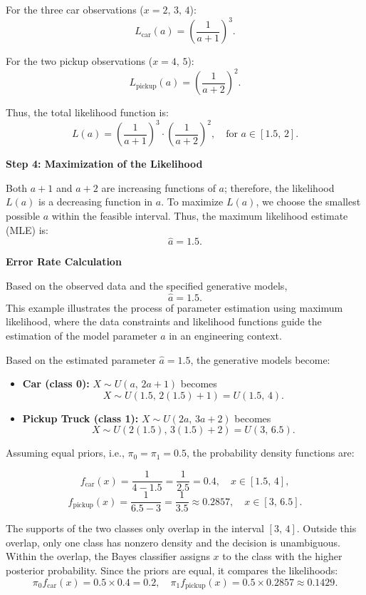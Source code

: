 \documentclass[12pt]{article}
\begin{document}
For the three car observations (\(x = 2,\, 3,\, 4\)):
\[
L_{\text{car}}(a) = \left(\frac{1}{a+1}\right)^3.
\]

For the two pickup observations (\(x = 4,\, 5\)):
\[
L_{\text{pickup}}(a) = \left(\frac{1}{a+2}\right)^2.
\]

Thus, the total likelihood function is:
\[
L(a) = \left(\frac{1}{a+1}\right)^3 \cdot \left(\frac{1}{a+2}\right)^2, \quad \text{for } a \in [1.5,\,2].
\]

\noindent \textbf{Step 4: Maximization of the Likelihood}

Both \(a+1\) and \(a+2\) are increasing functions of \(a\); therefore, the likelihood \(L(a)\) is a decreasing function in \(a\). To maximize \(L(a)\), we choose the smallest possible \(a\) within the feasible interval. Thus, the maximum likelihood estimate (MLE) is:
\[
\hat{a} = 1.5.
\]

\noindent \textbf{Error Rate Calculation}

Based on the observed data and the specified generative models,
\[
\boxed{\hat{a} = 1.5.}
\]
This example illustrates the process of parameter estimation using maximum likelihood, where the data constraints and likelihood functions guide the estimation of the model parameter \(a\) in an engineering context.

Based on the estimated parameter \(\hat{a} = 1.5\), the generative models become:

\begin{itemize}
    \item \textbf{Car (class 0):} \(X \sim U(a,\, 2a+1)\) becomes 
    \[
    X \sim U(1.5,\, 2(1.5)+1) = U(1.5,\, 4).
    \]
    \item \textbf{Pickup Truck (class 1):} \(X \sim U(2a,\, 3a+2)\) becomes 
    \[
    X \sim U(2(1.5),\, 3(1.5)+2) = U(3,\, 6.5).
    \]
\end{itemize}

Assuming equal priors, i.e., \(\pi_0 = \pi_1 = 0.5\), the probability density functions are:

\[
f_{\text{car}}(x) = \frac{1}{4-1.5} = \frac{1}{2.5} = 0.4, \quad x \in [1.5,\, 4],
\]
\[
f_{\text{pickup}}(x) = \frac{1}{6.5-3} = \frac{1}{3.5} \approx 0.2857, \quad x \in [3,\, 6.5].
\]

The supports of the two classes only overlap in the interval \([3,\, 4]\). Outside this overlap, only one class has nonzero density and the decision is unambiguous. Within the overlap, the Bayes classifier assigns \(x\) to the class with the higher posterior probability. Since the priors are equal, it compares the likelihoods:
\[
\pi_0 f_{\text{car}}(x) = 0.5 \times 0.4 = 0.2, \quad \pi_1 f_{\text{pickup}}(x) = 0.5 \times 0.2857 \approx 0.1429.
\]
\end{document}
